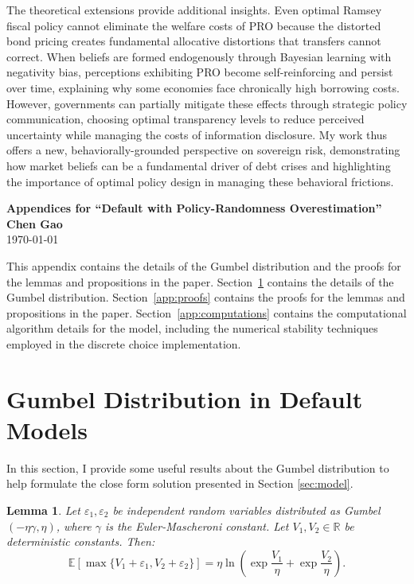 \documentclass[12pt]{article}
\theoremstyle{plain}
\newtheorem{lemma}{Lemma}
\begin{document}
The theoretical extensions provide additional insights. Even optimal Ramsey
fiscal policy cannot eliminate the welfare costs of PRO because the distorted
bond pricing creates fundamental allocative distortions that transfers cannot
correct. When beliefs are formed endogenously through Bayesian learning with
negativity bias, perceptions exhibiting PRO become self-reinforcing and persist
over time, explaining why some economies face chronically high borrowing costs.
However, governments can partially mitigate these effects through strategic
policy communication, choosing optimal transparency levels to reduce perceived
uncertainty while managing the costs of information disclosure. My work thus
offers a new, behaviorally-grounded perspective on sovereign risk,
demonstrating how market beliefs can be a fundamental driver of debt crises and
highlighting the importance of optimal policy design in managing these
behavioral frictions.

\clearpage
\appendix

\setcounter{equation}{0}
\renewcommand{\theequation}{\thesection.\arabic{equation}}

\begin{center}
	\Large \textbf{Appendices for ``Default with Policy-Randomness Overestimation''}\\
	\vspace{0.5cm}
	\large \textbf{Chen Gao}
	\\
	\large \today
\end{center}

This appendix contains the details of the Gumbel distribution and the proofs
for the lemmas and propositions in the paper. Section~\ref{app:gumbel} contains
the details of the Gumbel distribution. Section~\ref{app:proofs} contains the
proofs for the lemmas and propositions in the paper.
Section~\ref{app:computations} contains the computational algorithm details for
the model, including the numerical stability techniques employed in the
discrete choice implementation.

\section{Gumbel Distribution in Default Models}\label{app:gumbel}
In this section, I provide some useful results about the Gumbel distribution to
help formulate the close form solution presented in Section \ref{sec:model}.

\begin{lemma}
	\label{lem:gumbel_max_expectation}
	Let $\varepsilon_1, \varepsilon_2$ be independent random variables distributed as Gumbel$(-\eta\gamma, \eta)$, where $\gamma$ is the Euler-Mascheroni constant. Let $V_1, V_2 \in \mathbb{R}$ be deterministic constants. Then:
	\begin{equation}
		\mathbb{E}\left[\max\{V_1 + \varepsilon_1, V_2 + \varepsilon_2\}\right] = \eta \ln\left( \exp\frac{V_1}{\eta} + \exp\frac{V_2}{\eta} \right).
	\end{equation}
\end{lemma}
\end{document}
